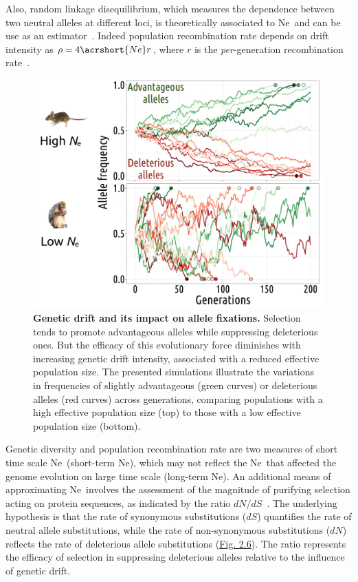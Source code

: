 Also, random linkage disequilibrium, which measures the dependence between two neutral alleles at different loci, is theoretically associated to \acrshort{Ne}~and can be use as an estimator~\citep{waples_practical_2024}. Indeed population recombination rate depends on drift intensity as $\rho = 4\acrshort{Ne}r$, where $r$ is the \textit{per}-generation recombination rate~\citep{waples_linkage_2010}.

\begin{figure}[H]
    \centering
    \includegraphics[width=0.7\linewidth]{figures/genetic_drift.png}
    \caption[Genetic drift and its impact on allele fixations]{\textbf{Genetic drift and its impact on allele fixations.} Selection tends to promote advantageous alleles while suppressing deleterious ones. But the efficacy of this evolutionary force diminishes with increasing genetic drift intensity, associated with a reduced \gls{effective population size}. The presented simulations illustrate the variations in frequencies of slightly advantageous (green curves) or deleterious alleles (red curves) across generations, comparing populations with a high \gls{effective population size} (top) to those with a low \gls{effective population size} (bottom).}
    \label{fig:geneticdrift}
\end{figure}


Genetic diversity and population recombination rate are two measures of short time scale \acrshort{Ne}~(short-term \acrshort{Ne}), which may not reflect the \acrshort{Ne}~that affected the genome evolution on large time scale (long-term \acrshort{Ne}). An additional means of approximating \acrshort{Ne}~involves the assessment of the magnitude of purifying selection acting on protein sequences, as indicated by the ratio ${dN}/{dS}$~\citep{kryazhimskiy_population_2008}.
The underlying hypothesis is that the rate of synonymous substitutions ($dS$) quantifies the rate of neutral allele substitutions, while the rate of \gls{non-synonymous} \gls{substitution}s ($dN$) reflects the rate of deleterious allele substitutions (\hyperref[fig:dnds]{Fig. 2.6}). The ratio \dnds represents the efficacy of selection in suppressing deleterious alleles relative to the influence of genetic drift.

